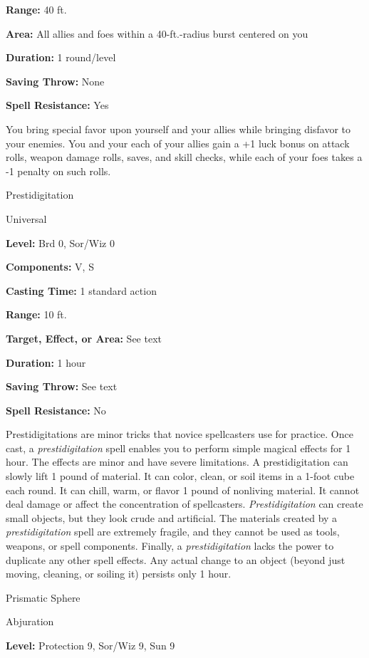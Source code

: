 \documentclass{article}
\begin{document}
\textbf{Range:} 40 ft.

\textbf{Area:} All allies and foes within a 40-ft.-radius burst centered on you

\textbf{Duration:} 1 round/level

\textbf{Saving Throw:} None

\textbf{Spell Resistance:} Yes

You bring special favor upon yourself and your allies while bringing disfavor to 
your enemies. You and your each of your allies gain a +1 luck bonus on attack rolls, 
weapon damage rolls, saves, and skill checks, while each of your foes takes a -1 
penalty on such rolls.

\vspace{12pt}
Prestidigitation

Universal

\textbf{Level:} Brd 0, Sor/Wiz 0

\textbf{Components:} V, S

\textbf{Casting Time:} 1 standard action

\textbf{Range:} 10 ft.

\textbf{Target, Effect, or Area: }See text

\textbf{Duration:} 1 hour

\textbf{Saving Throw:} See text

\textbf{Spell Resistance:} No

Prestidigitations are minor tricks that novice spellcasters use for practice. Once 
cast, a \textit{prestidigitation }spell enables you to perform simple magical effects 
for 1 hour. The effects are minor and have severe limitations. A prestidigitation 
can slowly lift 1 pound of material. It can color, clean, or soil items in a 1-foot 
cube each round. It can chill, warm, or flavor 1 pound of nonliving material. It 
cannot deal damage or affect the concentration of spellcasters. \textit{Prestidigitation 
}can create small objects, but they look crude and artificial. The materials created 
by a \textit{prestidigitation }spell are extremely fragile, and they cannot be 
used as tools, weapons, or spell components. Finally, a \textit{prestidigitation 
}lacks the power to duplicate any other spell effects. Any actual change to an 
object (beyond just moving, cleaning, or soiling it) persists only 1 hour.

\vspace{12pt}
Prismatic Sphere

Abjuration

\textbf{Level:} Protection 9, Sor/Wiz 9, Sun 9
\end{document}
